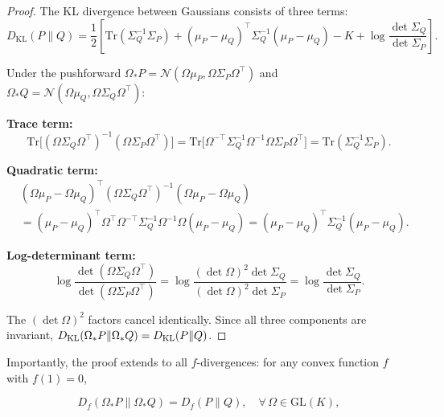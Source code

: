 \documentclass[twoside,11pt]{article}
\begin{document}
\begin{proof}
The KL divergence between Gaussians consists of three terms:
\begin{equation}
D_{\mathrm{KL}}(P \| Q) = \frac{1}{2}\left[\mathrm{Tr}(\Sigma_Q^{-1}\Sigma_P) + (\mu_P - \mu_Q)^\top \Sigma_Q^{-1}(\mu_P - \mu_Q) - K + \log\frac{\det\Sigma_Q}{\det\Sigma_P}\right].
\end{equation}

Under the pushforward $\Omega_* P = \mathcal{N}(\Omega\mu_P, \Omega\Sigma_P\Omega^\top)$ and $\Omega_* Q = \mathcal{N}(\Omega\mu_Q, \Omega\Sigma_Q\Omega^\top)$:

\textbf{Trace term:}
\begin{equation}
\mathrm{Tr}\big[(\Omega\Sigma_Q\Omega^\top)^{-1}(\Omega\Sigma_P\Omega^\top)\big] = \mathrm{Tr}\big[\Omega^{-\top}\Sigma_Q^{-1}\Omega^{-1}\Omega\Sigma_P\Omega^\top\big] = \mathrm{Tr}(\Sigma_Q^{-1}\Sigma_P). 
\end{equation}

\textbf{Quadratic term:}
\begin{align}
&(\Omega\mu_P - \Omega\mu_Q)^\top (\Omega\Sigma_Q\Omega^\top)^{-1} (\Omega\mu_P - \Omega\mu_Q) \nonumber\\
&= (\mu_P - \mu_Q)^\top \Omega^\top \Omega^{-\top}\Sigma_Q^{-1}\Omega^{-1}\Omega (\mu_P - \mu_Q) = (\mu_P - \mu_Q)^\top \Sigma_Q^{-1}(\mu_P - \mu_Q). 
\end{align}

\textbf{Log-determinant term:}
\begin{equation}
\log\frac{\det(\Omega\Sigma_Q\Omega^\top)}{\det(\Omega\Sigma_P\Omega^\top)} = \log\frac{(\det\Omega)^2 \det\Sigma_Q}{(\det\Omega)^2 \det\Sigma_P} = \log\frac{\det\Sigma_Q}{\det\Sigma_P}. 
\end{equation}

The $(\det\Omega)^2$ factors cancel identically. Since all three components are invariant, $\\ D_{\mathrm{KL}}(\Omega_* P \| \Omega_* Q) = D_{\mathrm{KL}}(P \| Q)$.
\end{proof}

Importantly, the proof extends to all $f$-divergences: for any convex function $f$ with $f(1) = 0$,

\begin{equation}
D_f(\Omega_* P \| \Omega_* Q) = D_f(P \| Q), \quad \forall\, \Omega \in \mathrm{GL}(K),
\end{equation}
\end{document}
